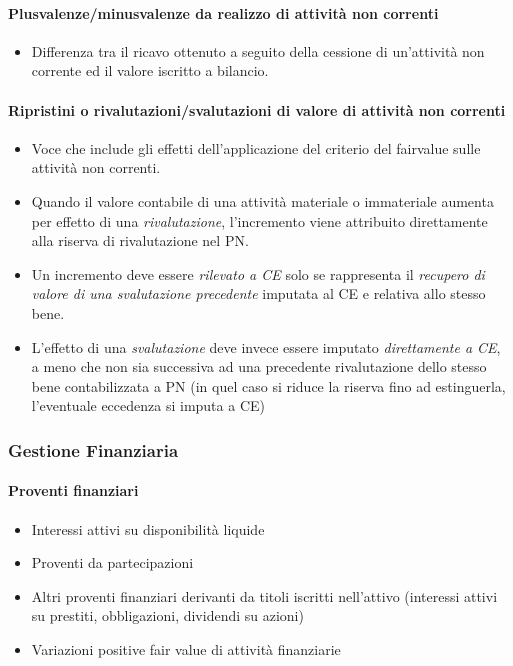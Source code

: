 \documentclass[10pt,a4paper,fleqn,oneside]{book}
\begin{document}
\paragraph{Plusvalenze/minusvalenze da realizzo di attività non correnti}
\begin{itemize}
    \item Differenza tra il ricavo ottenuto a seguito della cessione di un’attività non corrente ed il
    valore iscritto a bilancio.
\end{itemize}

\paragraph{Ripristini o rivalutazioni/svalutazioni di valore di attività non correnti}
\begin{itemize}
    \item Voce che include gli effetti dell’applicazione del criterio del \gls{fairvalue} sulle
    attività non correnti.
    \item Quando il valore contabile di una attività materiale o immateriale aumenta
    per effetto di una \emph{rivalutazione}, l’incremento viene attribuito
    direttamente alla riserva di rivalutazione nel PN.
    \item Un incremento deve essere \emph{rilevato a CE} solo se rappresenta il
    \emph{recupero di valore di una svalutazione precedente} imputata al
    CE e relativa allo stesso bene.
    \item L’effetto di una \emph{svalutazione} deve invece essere imputato \emph{direttamente
    a CE}, a meno che non sia successiva ad una precedente rivalutazione
    dello stesso bene contabilizzata a PN (in quel caso si riduce la riserva
    fino ad estinguerla, l’eventuale eccedenza si imputa a CE) 
\end{itemize}

\subsubsection{Gestione Finanziaria}

\paragraph{Proventi finanziari}
\begin{itemize}
    \item Interessi attivi su disponibilità liquide
    \item Proventi da partecipazioni
    \item Altri proventi finanziari derivanti da titoli iscritti nell’attivo (interessi
    attivi su prestiti, obbligazioni, dividendi su azioni)
    \item Variazioni positive fair value di attività finanziarie
\end{itemize}
\end{document}

